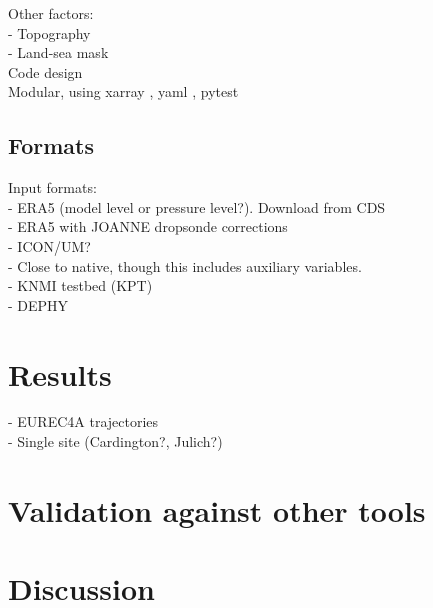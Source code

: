 \documentclass[a4paper,11pt]{article}
\begin{document}
Other factors: \\
- Topography \\
- Land-sea mask \\

Code design \\
Modular, using xarray \citep{hoyer2017}, yaml \citep{ben2009}, pytest \citep{okken2017}

\subsection{Formats}

Input formats: \\
- ERA5 (model level or pressure level?). Download from CDS \citep{raoult2017} \\
- ERA5 with JOANNE dropsonde corrections \citep{bony2019} \\
- ICON/UM? \\

- Close to native, though this includes auxiliary variables. \\
- KNMI testbed (KPT) \\
- DEPHY \\

\section{Results}

- EUREC4A trajectories \cite{bony2017} \\
- Single site (Cardington?, Julich?) \\

\section{Validation against other tools}


\section{Discussion}



\end{document}
